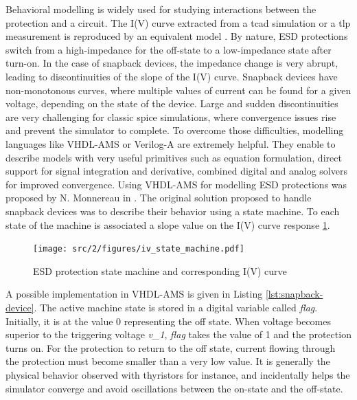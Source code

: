 Behavioral modelling is widely used for studying interactions between the protection and a circuit.
The I(V) curve extracted from a \gls{tcad} simulation or a \gls{tlp} measurement is reproduced by an equivalent model \cite{modelling-diode-esd, esd-diode-compact-model, tvs-modeling}.
By nature, ESD protections switch from a high-impedance for the off-state to a low-impedance state after turn-on.
In the case of snapback devices, the impedance change is very abrupt, leading to discontinuities of the slope of the I(V) curve.
Snapback devices have non-monotonous curves, where multiple values of current can be found for a given voltage, depending on the state of the device.
Large and sudden discontinuities are very challenging for classic \gls{spice} simulations, where convergence issues rise and prevent the simulator to complete.
To overcome those difficulties, modelling languages like VHDL-AMS or Verilog-A are extremely helpful.
They enable to describe models with very useful primitives such as equation formulation, direct support for signal integration and derivative, combined digital and analog solvers for improved convergence.
Using VHDL-AMS for modelling ESD protections was proposed by N. Monnereau in \cite{phd-monnereau}.
The original solution proposed to handle snapback devices was to describe their behavior using a state machine.
To each state of the machine is associated a slope value on the I(V) curve response \ref{fig:esd-protection-state-machine}.

\begin{figure}[!h]
  \centering
  \texttt{[image: src/2/figures/iv\_state\_machine.pdf]}
  \caption{ESD protection state machine and corresponding I(V) curve}
  \label{fig:esd-protection-state-machine}
\end{figure}

A possible implementation in VHDL-AMS is given in Listing \ref{lst:snapback-device}.
The active machine state is stored in a digital variable called \textit{flag}.
Initially, it is at the value 0 representing the off state.
When voltage becomes superior to the triggering voltage \textit{v\_1}, \textit{flag} takes the value of 1 and the protection turns on.
For the protection to return to the off state, current flowing through the protection must become smaller than a very low value.
It is generally the physical behavior observed with thyristors for instance, and incidentally helps the simulator converge and avoid oscillations between the on-state and the off-state.

\begin{code}
\inputminted[frame=single,breaklines=true]{VHDL}{src/2/snippets/beh_snapback.vhd}
\caption{Single snapback behavioral device model}
\label{lst:snapback-device}
\end{code}

